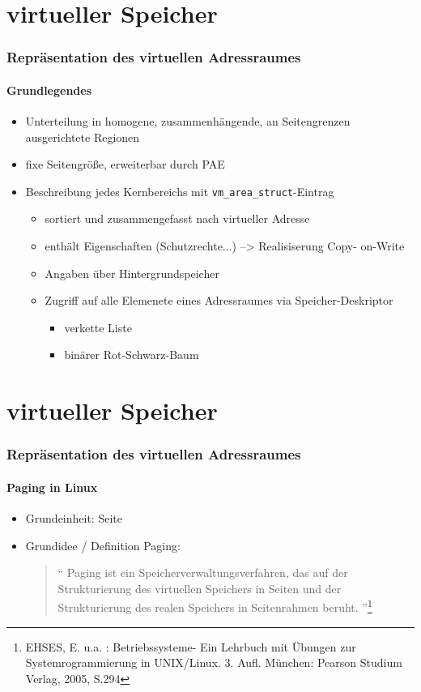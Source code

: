 \documentclass[ddcfooter]{tudbeamer}
\begin{document}
\section{virtueller Speicher}
\begin{frame}
    \frametitle{Repräsentation des virtuellen Adressraumes}
    \framesubtitle{Grundlegendes}
    \begin{itemize}
         \item   Unterteilung in homogene, zusammenhängende, an Seitengrenzen ausgerichtete 			Regionen
         \item fixe Seitengröße, erweiterbar durch PAE
         \item Beschreibung jedes Kernbereichs mit \texttt{vm\_area\_struct}-Eintrag 
         \begin{itemize}
         		\item sortiert und zusammengefasst nach virtueller Adresse\\
		\item enthält Eigenschaften (Schutzrechte...)
			--> Realisiserung Copy- on-Write
		\item Angaben über Hintergrundspeicher
    		\item Zugriff auf alle Elemenete eines Adressraumes via Speicher-Deskriptor
		\begin{itemize}
			\item verkette Liste
			\item binärer Rot-Schwarz-Baum
		\end{itemize}
   	\end{itemize} 
     \end{itemize}
    
\end{frame}

\section{virtueller Speicher}
\begin{frame}
    \frametitle{Repräsentation des virtuellen Adressraumes}
    \framesubtitle {Paging in Linux}
    \begin{itemize}
         \item  Grundeinheit: Seite
         \item Grundidee / Definition Paging: \\
        \begin{quote}
         \textquotedblleft
         Paging ist ein Speicherverwaltungsverfahren, das auf der Strukturierung  des virtuellen Speichers 	in Seiten und der Strukturierung des realen Speichers in Seitenrahmen beruht.
    	\textquotedblright \footnote {EHSES, E. u.a. : Betriebssysteme- Ein Lehrbuch mit Übungen zur   	Systemrogrammierung in UNIX/Linux. 3. Aufl. München: Pearson Studium Verlag, 2005, S.294  }
	\end{quote}
 	
	
    
    
     \end{itemize}
    
\end{frame}
\end{document}
